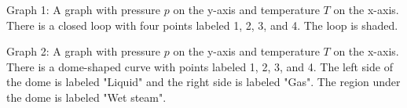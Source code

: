 Graph 1: A graph with pressure \( p \) on the y-axis and temperature \( T \) on the x-axis. There is a closed loop with four points labeled 1, 2, 3, and 4. The loop is shaded.

Graph 2: A graph with pressure \( p \) on the y-axis and temperature \( T \) on the x-axis. There is a dome-shaped curve with points labeled 1, 2, 3, and 4. The left side of the dome is labeled "Liquid" and the right side is labeled "Gas". The region under the dome is labeled "Wet steam".